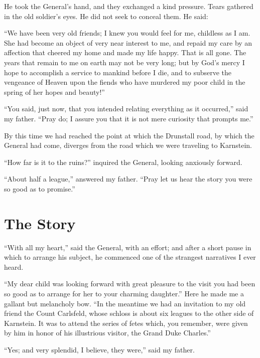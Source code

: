 \documentclass[11pt,twoside,makeidx,hidelinks,]{memoir}
\begin{document}
He took the General's hand, and they exchanged a kind pressure. Tears
gathered in the old soldier's eyes. He did not seek to conceal them.
He said:

``We have been very old friends; I knew you would feel for me, childless
as I am. She had become an object of very near interest to me, and
repaid my care by an affection that cheered my home and made my life
happy. That is all gone. The years that remain to me on earth may not be
very long; but by God's mercy I hope to accomplish a service to mankind
before I die, and to subserve the vengeance of Heaven upon the fiends
who have murdered my poor child in the spring of her hopes and beauty!''

``You said, just now, that you intended relating everything as it
occurred,'' said my father. ``Pray do; I assure you that it is not mere
curiosity that prompts me.''

By this time we had reached the point at which the Drunstall road, by
which the General had come, diverges from the road which we were
traveling to Karnstein.

``How far is it to the ruins?'' inquired the General, looking anxiously
forward.

``About half a league,'' answered my father. ``Pray let us hear the story
you were so good as to promise.''

\pbreak{}

\chapter{The Story}\hypertarget{the-story}{}\label{the-story}

``With all my heart,'' said the General, with an effort; and after a short
pause in which to arrange his subject, he commenced one of the strangest
narratives I ever heard.

``My dear child was looking forward with great pleasure to the visit you
had been so good as to arrange for her to your charming daughter.'' Here
he made me a gallant but melancholy bow. ``In the meantime we had an
invitation to my old friend the Count Carlsfeld, whose schloss is about
six leagues to the other side of Karnstein. It was to attend the series
of fetes which, you remember, were given by him in honor of his
illustrious visitor, the Grand Duke Charles.''

``Yes; and very splendid, I believe, they were,'' said my father.
\end{document}
